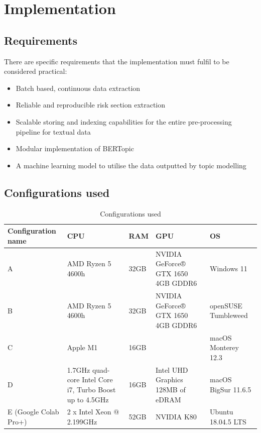 \documentclass[12pt,MSc,a4paper,oneside]{muthesis}
\begin{document}
\chapter{Implementation}

\section{Requirements}
There are specific requirements that the implementation must fulfil to be considered practical:
\begin{itemize}
  \item Batch based, continuous data extraction
  \item Reliable and reproducible risk section extraction
  \item Scalable storing and indexing capabilities for the entire pre-processing pipeline for textual data
  \item Modular implementation of BERTopic
  \item A machine learning model to utilise the data outputted by topic modelling
\end{itemize}
\newpage

\section{Configurations used}

\begin{table}[h]
  \caption{Configurations used}
  \label{tab:freq}
  \begin{tabularx}{\textwidth}{|X|X|X|X|X|}
    \toprule
    {Configuration name}&{CPU}&{RAM}&{GPU}&{OS}\\
    \midrule
    A & AMD Ryzen 5 4600h & 32GB & NVIDIA GeForce® GTX 1650 4GB GDDR6 & Windows 11\\ \hline
    B & AMD Ryzen 5 4600h & 32GB & NVIDIA GeForce® GTX 1650 4GB GDDR6 & openSUSE Tumbleweed\\ \hline
    C & Apple M1 & 16GB &  & macOS Monterey 12.3\\ \hline
    D & 1.7GHz quad-core Intel Core i7, Turbo Boost up to 4.5GHz & 16GB & Intel UHD Graphics 128MB of eDRAM & macOS BigSur 11.6.5\\ \hline
    E (Google Colab Pro+) & 2 x Intel Xeon @ 2.199GHz & 52GB & NVIDIA K80 & Ubuntu 18.04.5 LTS\\ 
  \bottomrule
\end{tabularx}
\end{table}
\end{document}
